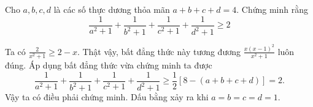 \begin{problem}
    Cho $a, b, c, d$ là các số thực dương thỏa mãn $a + b + c + d = 4$. Chứng minh rằng
    $$
        \frac{1}{a^2 + 1} + \frac{1}{b^2 + 1} + \frac{1}{c^2 + 1} + \frac{1}{d^2 + 1} \ge 2
    $$
    \solution
    
    Ta có $\displaystyle \frac{2}{x^2 + 1} \ge 2 - x$. Thật vậy, bất đẳng thức này tương đương $\displaystyle \frac{x(x - 1)^2}{x^2 + 1}$ luôn đúng. Áp dụng bất đẳng thức vừa chứng minh ta được
    $$
        \frac{1}{a^2 + 1} + \frac{1}{b^2 + 1} + \frac{1}{c^2 + 1} + \frac{1}{d^2 + 1} \ge \frac{1}{2}[8 - (a + b + c + d)] = 2.
    $$
    Vậy ta có điều phải chứng minh. Dấu bằng xảy ra khi $a = b = c = d = 1$.
\end{problem}